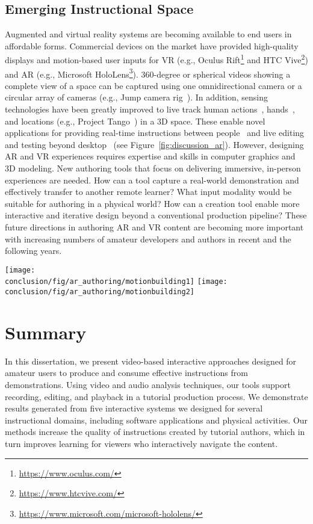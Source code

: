 \subsection{Emerging Instructional Space}
Augmented and virtual reality systems are becoming available to end users in affordable forms. Commercial devices on the market have provided high-quality displays and motion-based user inputs for VR (e.g., Oculus Rift\footnote{\url{https://www.oculus.com/}} and HTC Vive\footnote{\url{https://www.htcvive.com/}}) and AR (e.g., Microsoft HoloLens\footnote{\url{https://www.microsoft.com/microsoft-hololens/}}). 360-degree or spherical videos showing a complete view of a space can be captured using one omnidirectional camera or a circular array of cameras (e.g., Jump camera rig~\cite{GoogleJump}).
%
In addition, sensing technologies have been greatly improved to live track human actions~\cite{dou-siggraph2016}, hands~\cite{taylor-siggraph2016}, and locations (e.g., Project Tango~\cite{GoogleTango}) in a 3D space.
%
These enable novel applications for providing real-time instructions between people~\cite{Gurevich:2012ko,MicrosoftHoloLensSkype} and live editing and testing beyond desktop~\cite{MotionBuilderAR} (see Figure~\ref{fig:discussion_ar}).
%
However, designing AR and VR experiences requires expertise and skills in computer graphics and 3D modeling. New authoring tools that focus on delivering immersive, in-person experiences are needed.
How can a tool capture a real-world demonstration and effectively transfer to another remote learner? What input modality would be suitable for authoring in a physical world? How can a creation tool enable more interactive and iterative design beyond a conventional production pipeline?
%
These future directions in authoring AR and VR content are becoming more important with increasing numbers of amateur developers and authors in recent and the following years.

\begin{figure*}[t!]
  \centering
  \texttt{[image: \\conclusion/fig/ar\_authoring/motionbuilding1]}
  \texttt{[image: \\conclusion/fig/ar\_authoring/motionbuilding2]}
  \caption{
    A recent Augmented Reality (AR) application enables reviewing character animation beyond a desktop in a room-size environment~\cite{MotionBuilderAR}, licensed under CC BY 2.0.
  }
  \label{fig:discussion_ar}
\end{figure*}

\clearpage

\section{Summary}
In this dissertation, we present video-based interactive approaches designed for amateur users to produce and consume effective instructions from demonstrations. Using video and audio analysis techniques, our tools support recording, editing, and playback in a tutorial production process. We demonstrate results generated from five interactive systems we designed for several instructional domains, including software applications and physical activities. Our methods increase the quality of instructions created by tutorial authors, which in turn improves learning for viewers who interactively navigate the content.
